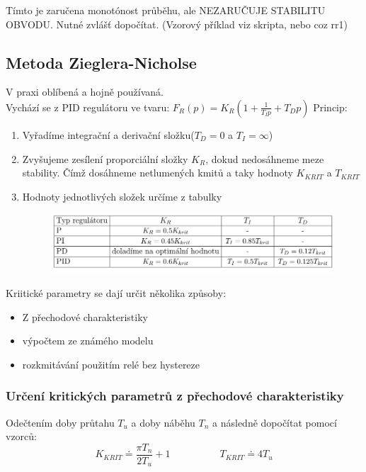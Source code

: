 Tímto je zaručena monotónost průběhu, ale NEZARUČUJE STABILITU OBVODU.  Nutné zvlášť dopočítat.
(Vzorový příklad viz skripta, nebo coz rr1)\\
\newpage

\subsection*{Metoda Zieglera-Nicholse}
V praxi oblíbená a hojně používaná.\\
Vychází se z PID regulátoru ve tvaru: $F_R(p) = K_R(1+\frac{1}{T_Ip}+T_Dp)$
Princip:
\begin{enumerate}
    \item Vyřadíme integrační a derivační složku($T_D = 0$ a $T_I = \infty$)
    \item Zvyšujeme zesílení proporciální složky $K_R$, dokud nedosáhneme meze stability. Čímž dosáhneme netlumených kmitů a taky hodnoty $K_{KRIT}$ a $T_{KRIT}$
    \item Hodnoty jednotlivých složek určíme z tabulky
          \begin{figure}[H]
              \includegraphics*[scale = 1]{images/ZHtab.png}
          \end{figure}
\end{enumerate}
Kriitické parametry se dají určit několika způsoby:
\begin{itemize}
    \item Z přechodové charakteristiky
    \item výpočtem ze známého modelu
    \item rozkmitávání použitím relé bez hystereze
\end{itemize}

\subsubsection*{Určení kritických parametrů z přechodové charakteristiky}
Odečtením doby průtahu $T_u$ a doby náběhu $T_n$ a následně dopočítat pomocí vzorců:
\begin{equation}
    K_{KRIT} \doteq \frac{\pi T_n}{2T_u}+1 \;\;\;\;\;\;\;\;\;\;\;\;\;\;\;\;\;\; T_{KRIT} \doteq 4T_u
\end{equation}

